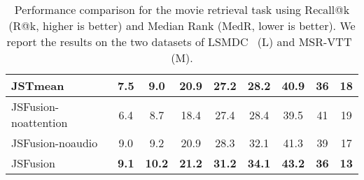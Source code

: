 \documentclass[runningheads]{llncs}
\begin{document}
\begin{table*}[tb]
\begin{tabular}{|l|cc|cc|cc|cc|}
JSTmean                                & 7.5   & 9.0       & 20.9     & 27.2   & 28.2   & 40.9     & 36    & 18        \\ \hline
JSFusion-noattention                   & 6.4   & 8.7       & 18.4     & 27.4   & 28.4   & 39.5     & 41    & 19        \\ 
JSFusion-noaudio                       & 9.0   & 9.2       & 20.9     & 28.3   & 32.1   & 41.3     & 39    & 17        \\ JSFusion                               & \textbf{9.1} & \textbf{10.2} & \textbf{21.2} & \textbf{31.2} & \textbf{34.1} & \textbf{43.2} & \textbf{36} & \textbf{13}\\ \hline
\end{tabular}
\medskip
\caption{
Performance comparison for the movie retrieval task using Recall@k (R@k, higher is better) and Median Rank (MedR, lower is better).
We report the results on the two datasets of LSMDC~\cite{rohrbach-arxiv-2016} (L) and MSR-VTT~\cite{xu-CVPR-2016} (M).
}
\vspace{-5pt}

\label{tbl:results_ret}
\end{table*}
\end{document}
